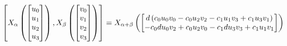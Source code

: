 \documentclass[11pt]{article}
\theoremstyle{definition}
\begin{document}
\[
\scaletoalign{\textwidth}{\left[ X_{\alpha}\left(\left[\begin{matrix}u_{0}\\u_{1}\\u_{2}\\u_{3}\end{matrix}\right]\right), X_{\beta}\left(\left[\begin{matrix}v_{0}\\v_{1}\\v_{2}\\v_{3}\end{matrix}\right]\right) \right] = X_{\alpha + \beta}\left(\left[\begin{matrix}d \left(c_{0} u_{0} v_{0} - c_{0} u_{2} v_{2} - c_{1} u_{1} v_{3} + c_{1} u_{3} v_{1}\right)\\- c_{0} d u_{0} v_{2} + c_{0} u_{2} v_{0} - c_{1} d u_{3} v_{3} + c_{1} u_{1} v_{1}\end{matrix}\right]\right)}
\]
\end{document}
